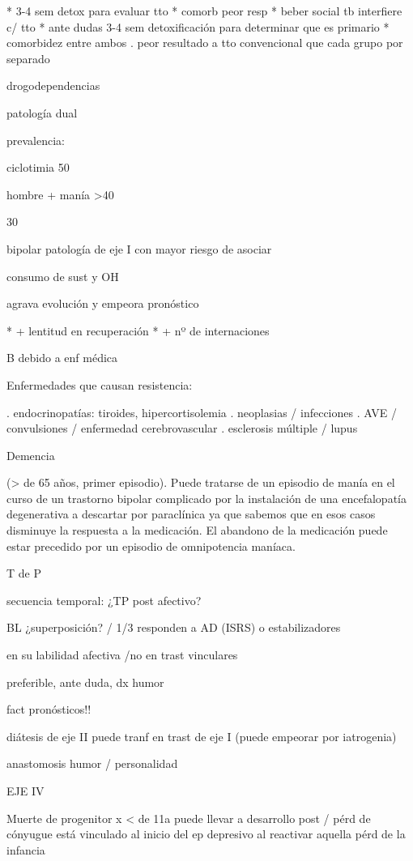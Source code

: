 * 3-4 sem detox para evaluar tto
* comorb peor resp
* beber social tb interfiere c/ tto
* ante dudas 3-4 sem detoxificación para determinar que es primario
* comorbidez entre ambos . peor resultado a tto convencional que cada grupo por separado

drogodependencias

patología dual

prevalencia:

ciclotimia 50%

hombre + manía >40%

30%

bipolar patología de eje I con mayor riesgo de asociar

consumo de sust y OH

agrava evolución y empeora pronóstico

* + lentitud en recuperación
* + nº de internaciones

B debido a enf médica

Enfermedades que causan resistencia:

. endocrinopatías: tiroides, hipercortisolemia
. neoplasias / infecciones
. AVE / convulsiones / enfermedad cerebrovascular
. esclerosis múltiple / lupus

Demencia

(> de 65 años, primer episodio). Puede tratarse de un episodio de manía en el curso de un trastorno bipolar complicado por la instalación de una encefalopatía degenerativa a descartar por paraclínica ya que sabemos que en esos casos disminuye la respuesta a la medicación. El abandono de la medicación puede estar precedido por un episodio de omnipotencia maníaca.

T de P

secuencia temporal: ¿TP post afectivo?

BL ¿superposición? / 1/3 responden a AD (ISRS) o estabilizadores

en su labilidad afectiva /no en trast vinculares

preferible, ante duda, dx humor

fact pronósticos!!

diátesis de eje II puede tranf en trast de eje I (puede empeorar por iatrogenia)

anastomosis humor / personalidad

EJE IV

Muerte de progenitor x < de 11a puede llevar a desarrollo post / pérd de cónyugue está vinculado al inicio del ep depresivo al reactivar aquella pérd de la infancia

